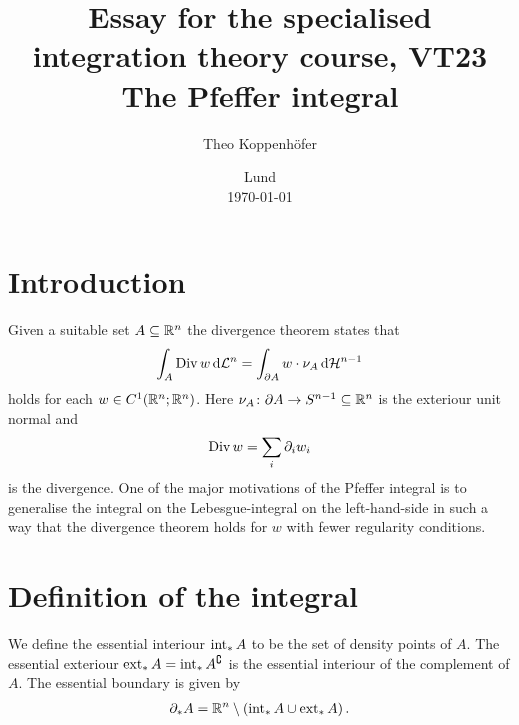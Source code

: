 




\title{ Essay for the specialised integration theory course, VT23 \\[1ex]
	  \large The Pfeffer integral}
\author{Theo Koppenhöfer}
\date{Lund \\[1ex] \today}







\maketitle

\section{Introduction}

Given a suitable set $A\subseteq\mathbb{R}^n$ the divergence theorem states that
\begin{align*}
	\int_A\operatorname{Div} w\,\mathrm{d} \mathcal{L}^n=\int_{\partial A}w\cdot\nu_A\,\mathrm{d} \mathcal{H}^{n-1}
\end{align*}
holds for each $w\in C^1(\mathbb{R}^n;\mathbb{R}^n)$. Here $\nu_A\colon \partial A\to S^{n-1}\subseteq\mathbb{R}^n$ is the exteriour unit normal and
\begin{align*}
	\operatorname{Div} w=\sum_i\partial_iw_i
\end{align*}
is the divergence. One of the major motivations of the Pfeffer integral is to generalise the integral on the Lebesgue-integral on the left-hand-side in such a way that the divergence theorem holds for $w$ with fewer regularity conditions.

\section{Definition of the integral}

\begin{definition}
We define the essential interiour $\operatorname{int}_*A$ to be the set of density points of $A$.
The essential exteriour $\operatorname{ext}_*A=\operatorname{int}_*A^\complement$ is the essential interiour of the complement of $A$. The essential boundary is given by
\begin{align*}
	\partial_*A=\mathbb{R}^n\setminus(\operatorname{int}_*A\cup\operatorname{ext}_*A)\,.
\end{align*}
\end{definition}

